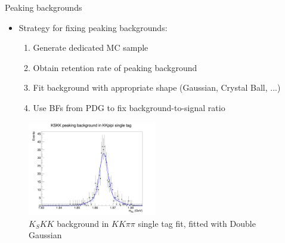 \documentclass{beamer}
\begin{document}
\begin{frame}{Peaking backgrounds}
  \begin{itemize}
    \item{Strategy for fixing peaking backgrounds:}
    \begin{enumerate}
      \item{Generate dedicated MC sample}
      \item{Obtain retention rate of peaking background}
      \item{Fit background with appropriate shape (Gaussian, Crystal Ball, ...)}
      \item{Use BFs from PDG to fix background-to-signal ratio}
    \end{enumerate}
  \end{itemize}
  \begin{figure}
    \centering
    \includegraphics[width=0.50\textwidth]{Plots/KSKKtoKKpipi_Fit.png}
    \caption{$K_SKK$ background in $KK\pi\pi$ single tag fit, fitted with Double Gaussian}
  \end{figure}
\end{frame}
\end{document}
